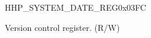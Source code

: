 \begin{register}{H}{HP\_SYSTEM\_DATE\_REG}{0x03FC}\label{regdesc:HPSYSTEMDATEREG}
%
%
\regnewline%
\begin{regdesc}\begin{reglist}
\label{fielddesc:HPSYSTEMDATE}\item [HP\_SYSTEM\_DATE] Version control register. (R/W)
\end{reglist}\end{regdesc}
\end{register}
